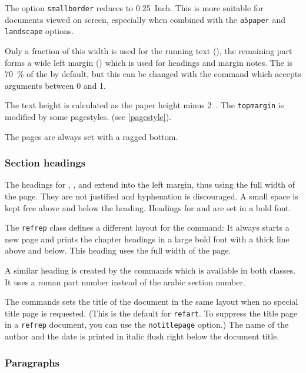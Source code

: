 The option \texttt{smallborder} reduces  to 0.25~Inch.
This is more suitable for documents viewed on screen, especially when
combined with the \texttt{a5paper} and \texttt{landscape} options.

Only a fraction of this width is used for the running text (),
the remaining part forms a wide left margin () which is
used for headings and margin notes.  The  is 70~\% of the
 by default, but this can be changed with the
 command which accepts arguments
between 0 and 1.

 The text height is
calculated as the paper height minus 2~. The
\texttt{topmargin} is modified by some pagestyles. (see \ref{pagestyle}).

The pages are always set with a ragged bottom.

\subsubsection{Section headings}

The headings for , , and 
 extend into the left margin, thus using the full 
width of the page.  They are not justified and hyphenation is 
discouraged.  A small space is kept free above and below the heading.  
Headings for  and  are set in a bold 
font.

The \texttt{refrep} class defines a different layout for the  
 command: It always starts a new page and prints the 
chapter headings in a large bold font with a thick line above and 
below. This heading uses the full width of the page.

A similar heading is created by the  commands which is 
available in both classes. It uses a roman part number instead of the 
arabic section number.

The  commands sets the title of the document in the 
same layout when no special title page is requested.  (This is the 
default for \texttt{refart}.  To suppress the title page in a 
\texttt{refrep} document, you can use the \texttt{notitlepage} option.) 
The name of the author and the date is printed in italic flush right 
below the document title.

\subsubsection{Paragraphs}

